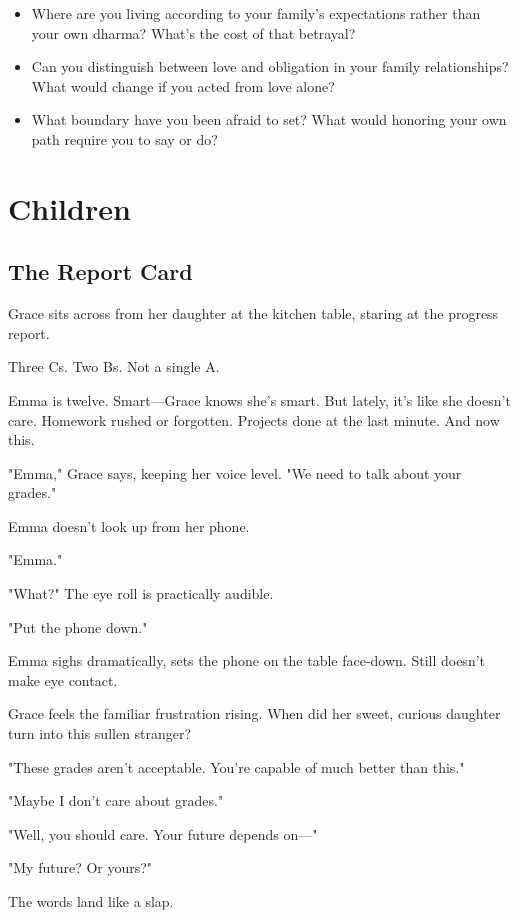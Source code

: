\documentclass[11pt,twoside]{book}
\begin{document}
\begin{itemize}
\item Where are you living according to your family's expectations rather than your own dharma? What's the cost of that betrayal?
\item Can you distinguish between love and obligation in your family relationships? What would change if you acted from love alone?
\item What boundary have you been afraid to set? What would honoring your own path require you to say or do?
\end{itemize}

\chapter{Children}

\section*{The Report Card}

Grace sits across from her daughter at the kitchen table, staring at the progress report.

Three Cs. Two Bs. Not a single A.

Emma is twelve. Smart—Grace knows she's smart. But lately, it's like she doesn't care. Homework rushed or forgotten. Projects done at the last minute. And now this.

"Emma," Grace says, keeping her voice level. "We need to talk about your grades."

Emma doesn't look up from her phone.

"Emma."

"What?" The eye roll is practically audible.

"Put the phone down."

Emma sighs dramatically, sets the phone on the table face-down. Still doesn't make eye contact.

Grace feels the familiar frustration rising. When did her sweet, curious daughter turn into this sullen stranger?

"These grades aren't acceptable. You're capable of much better than this."

"Maybe I don't care about grades."

"Well, you should care. Your future depends on—"

"My future? Or yours?"

The words land like a slap.
\end{document}
